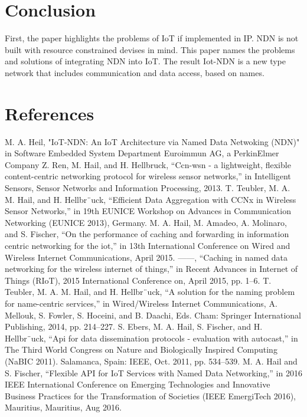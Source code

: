 \documentclass[conference]{IEEEtran}
\begin{document}
\section{Conclusion}
First, the paper highlights the problems of IoT if implemented in IP. 
NDN is not built with resource constrained devises in mind. This paper names the problems and solutions of integrating NDN into IoT.
The result Iot-NDN is a new type network that includes communication and data access, based on names.








\section{References}
\begin{thebibliography}{00}
    M. A. Heil, "IoT-NDN: An IoT Architecture via Named Data
    Netwoking (NDN)" in Software Embedded System Department
    Euroimmun AG, a PerkinElmer Company
     Z. Ren, M. Hail, and H. Hellbruck, “Ccn-wsn - a lightweight, flexible
    content-centric networking protocol for wireless sensor networks,” in
    Intelligent Sensors, Sensor Networks and Information Processing, 2013.
     T. Teubler, M. A. M. Hail, and H. Hellbr¨uck, “Efficient Data Aggregation
    with CCNx in Wireless Sensor Networks,” in 19th EUNICE Workshop
    on Advances in Communication Networking (EUNICE 2013), Germany.
    M. A. Hail, M. Amadeo, A. Molinaro, and S. Fischer, “On the performance
    of caching and forwarding in information centric networking for
    the iot,” in 13th International Conference on Wired and Wireless Internet
    Communications, April 2015.
    ——, “Caching in named data networking for the wireless internet
    of things,” in Recent Advances in Internet of Things (RIoT), 2015
    International Conference on, April 2015, pp. 1–6.
    T. Teubler, M. A. M. Hail, and H. Hellbr¨uck, “A solution for the
    naming problem for name-centric services,” in Wired/Wireless Internet
    Communications, A. Mellouk, S. Fowler, S. Hoceini, and B. Daachi,
    Eds. Cham: Springer International Publishing, 2014, pp. 214–227.
    S. Ebers, M. A. Hail, S. Fischer, and H. Hellbr¨uck, “Api for data
    dissemination protocols - evaluation with autocast,” in The Third World
    Congress on Nature and Biologically Inspired Computing (NaBIC 2011).
    Salamanca, Spain: IEEE, Oct. 2011, pp. 534–539.
    M. A. Hail and S. Fischer, “Flexible API for IoT Services with Named
    Data Networking,” in 2016 IEEE International Conference on Emerging
    Technologies and Innovative Business Practices for the Transformation
    of Societies (IEEE EmergiTech 2016), Mauritius, Mauritius, Aug 2016.
    \end{thebibliography}
\end{document}
